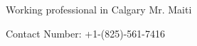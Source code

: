 

\begin{cventries}

  \cventry
    {Working professional in Calgary} %
    {Mr. Maiti} %
    {} %
    {} %
    {
      \begin{cvitems} %
        \item {Contact Number: +1-(825)-561-7416}
      \end{cvitems}
    }
\end{cventries}
